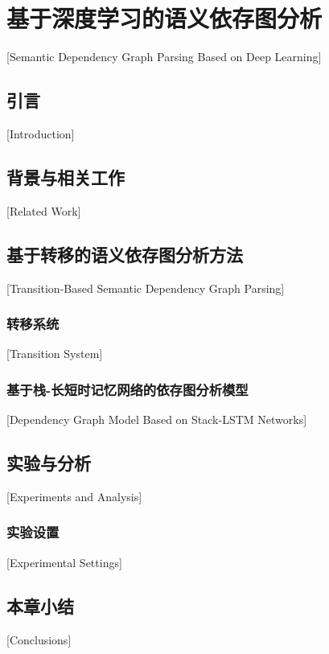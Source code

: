 
\chapter[基于深度学习的语义依存图分析]{基于深度学习的语义依存图分析}[Semantic Dependency Graph Parsing Based on Deep Learning]

\section{引言}[Introduction]

\section{背景与相关工作}[Related Work]

\section{基于转移的语义依存图分析方法}[Transition-Based Semantic Dependency Graph Parsing]

\subsection{转移系统}[Transition System]

\subsection{基于栈-长短时记忆网络的依存图分析模型}[Dependency Graph Model Based on Stack-LSTM Networks]

\section{实验与分析}[Experiments and Analysis]

\subsection{实验设置}[Experimental Settings]


\section{本章小结}[Conclusions]


